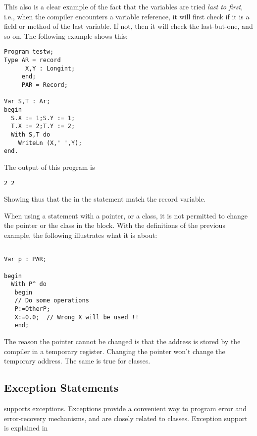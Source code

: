 This also is a clear example of the fact that the variables are tried {\em last
to first}, i.e., when the compiler encounters a variable reference, it will
first check if it is a field or method of the last variable. If not, then it
will check the last-but-one, and so on.
The following example shows this;
\begin{verbatim}
Program testw;
Type AR = record
      X,Y : Longint;
     end;
     PAR = Record;

Var S,T : Ar;
begin
  S.X := 1;S.Y := 1;
  T.X := 2;T.Y := 2;
  With S,T do
    WriteLn (X,' ',Y);
end.
\end{verbatim}
The output of this program is
\begin{verbatim}
2 2
\end{verbatim}
Showing thus that the  in the  statement match the
 record variable.

\begin{remark}
When using a  statement with a pointer, or a class, it is not
permitted to change the pointer or the class in the  block.
With the definitions of the previous example, the following illustrates
what it is about:
\begin{verbatim}

Var p : PAR;

begin
  With P^ do
   begin
   // Do some operations
   P:=OtherP;
   X:=0.0;  // Wrong X will be used !!
   end;
\end{verbatim}
The reason the pointer cannot be changed is that the address is stored
by the compiler in a temporary register. Changing the pointer won't change
the temporary address. The same is true for classes.
\end{remark}

\subsection{Exception Statements}
\fpc supports exceptions. Exceptions provide a convenient way to
program error and error-recovery mechanisms, and are
closely related to classes.
Exception support is explained in 

